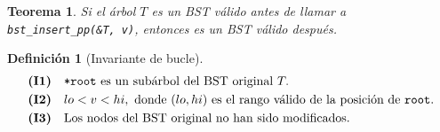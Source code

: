 \documentclass[11pt, letterpaper]{article}
\theoremstyle{definition}
\newtheorem{definition}{Definición}[section]
\theoremstyle{plain}
\newtheorem{theorem}{Teorema}[section]
\theoremstyle{remark}
\begin{document}
\begin{theorem}\label{thm:iterative}
Si el árbol $T$ es un BST válido antes de llamar a
\texttt{bst\_insert\_pp(\&T, v)}, entonces es un BST válido después.
\end{theorem}

\begin{definition}[Invariante de bucle]
\begin{align}
  \textbf{(I1)}&\quad \text{\texttt{*root} es un subárbol del BST original } T. \notag\\
  \textbf{(I2)}&\quad lo < v < hi, \text{ donde } (lo, hi) \text{ es el rango válido de la posición de \texttt{root}.} \notag\\
  \textbf{(I3)}&\quad \text{Los nodos del BST original no han sido modificados.} \notag
\end{align}
\end{definition}
\end{document}
